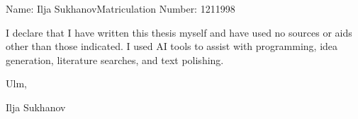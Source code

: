 \documentclass[a4paper,12pt,
headsepline,           %
oneside,               %
pointlessnumbers,      %
bibtotoc,              %
BCOR15mm               %
]{scrbook}
\newcommand{\fullname}{Ilja Sukhanov}
\newcommand{\matnr}{1211998}
\begin{document}
\printbibliography

\clearpage
\thispagestyle{empty}

Name: \fullname \hfill Matriculation Number: \matnr \vspace{2cm}



I declare that I have written this thesis myself and have used no sources or aids other than those indicated. I used AI tools to assist with programming, idea generation, literature searches, and text polishing.\vspace{2cm}



Ulm, \dotfill

\hspace{10cm} {\footnotesize \fullname}
\end{document}
